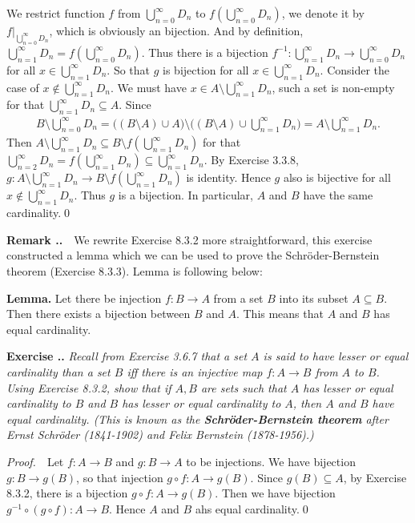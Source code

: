 \documentclass{book}
\newcommand{\pff}{\vspace{.25em}\noindent\emph{Proof.}~~}
\newcommand{\remark}{\vspace{.5em}\noindent\textbf{Remark \textbf{\theExercise}}~~}
\newcommand{\titl}[1]{\noindent\textbf{#1}}
\newcounter{Exercise}[section]
\renewcommand{\theExercise}{\thesection.\arabic{Exercise}.}
\newcommand{\new}{\vspace{1.5em}\noindent\textbf{{Exercise \stepcounter{Exercise}\textbf{\theExercise}}} }
\begin{document}
We restrict function $f$ from $\bigcup_{n=0}^{\infty}D_n$ to $f(\bigcup_{n=0}^{\infty}D_n)$, we denote it by $f|_{\bigcup_{n=0}^{\infty}D_n}$, which is obviously an bijection. And by definition, $\bigcup_{n=1}^{\infty}D_n=f(\bigcup_{n=0}^{\infty}D_n)$. Thus there is a bijection $f^{-1}:\bigcup_{n=1}^{\infty}D_n\to \bigcup_{n=0}^{\infty}D_n$ for all $x\in\bigcup_{n=1}^{\infty}D_n$. So that $g$ is bijection for all $x\in\bigcup_{n=1}^{\infty}D_n$. Consider the case of $x\notin\bigcup_{n=1}^{\infty}D_n$. We must have $x\in A\setminus\bigcup_{n=1}^{\infty}D_n$, such a set is non-empty for that $\bigcup_{n=1}^{\infty}D_n\subseteq A$. Since
    \begin{align*}
        B\setminus\bigcup_{n=0}^{\infty}D_n
        =\Big((B\setminus A)\cup A\Big)
        \setminus\Big((B\setminus A)\cup\bigcup_{n=1}^{\infty}D_n\Big)=A\setminus\bigcup_{n=1}^{\infty}D_n.
    \end{align*}
Then $A\setminus\bigcup_{n=1}^{\infty}D_n\subseteq B\setminus f(\bigcup_{n=1}^{\infty}D_n)$ for that $\bigcup_{n=2}^{\infty}D_n=f(\bigcup_{n=1}^{\infty}D_n)\subseteq\bigcup_{n=1}^{\infty}D_n$. By Exercise 3.3.8, $g:A\setminus\bigcup_{n=1}^{\infty}D_n\to B\setminus f(\bigcup_{n=1}^{\infty}D_n)$ is identity. Hence $g$ also is bijective for all $x\notin\bigcup_{n=1}^{\infty}D_n$. Thus $g$ is a bijection. In particular, $A$ and $B$ have the same cardinality.\qed

\remark We rewrite Exercise 8.3.2 more straightforward, this exercise constructed a lemma which we can be used to prove the Schr\"oder-Bernstein theorem (Exercise 8.3.3). Lemma is following below:
\begin{framed}
\titl{Lemma.} Let there be injection $f:B\to A$ from a set $B$ into its subset $A\subseteq B$. Then there exists a bijection between $B$ and $A$. This means that $A$ and $B$ has equal cardinality.
\end{framed}


\new\emph{Recall from Exercise 3.6.7 that a set $A$ is said to have lesser or equal cardinality than a set $B$ iff there is an injective map $f:A\to B$ from $A$ to $B$. Using Exercise 8.3.2, show that if $A,B$ are sets such that $A$ has lesser or equal cardinality to $B$ and $B$ has lesser or equal cardinality to $A$, then $A$ and $B$ have equal cardinality. (This is known as the \textbf{Schr\"oder-Bernstein theorem} after Ernst Schr\"oder (1841-1902) and Felix Bernstein (1878-1956).)}

\pff Let $f:A\to B$ and $g:B\to A$ to be injections. We have bijection $g:B\to g(B)$, so that injection $g\circ f:A\to g(B)$. Since $g(B)\subseteq A$, by Exercise 8.3.2, there is a bijection $g\circ f:A\to g(B)$. Then we have bijection $g^{-1}\circ(g\circ f):A\to B$. Hence $A$ and $B$ ahs equal cardinality.\qed
\end{document}
